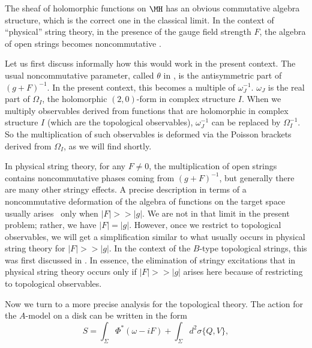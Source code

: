 The sheaf of holomorphic functions on $\MH$ has an obvious
commutative algebra structure, which is the correct one in the
classical limit. In the context of ``physical'' string theory, in
the presence of the gauge field strength $F$, the algebra of open
strings becomes noncommutative \cite{ref137}.

Let us first discuss informally how
this would work in the present context.  The usual noncommutative parameter, called $\theta$ in
\cite{ref137}, is the antisymmetric
part of $(g+F)^{-1}$.  In the present context, this becomes a multiple of $\omega_J^{-1}$.  $\omega_J$
is the real part of $\Omega_I$, the holomorphic $(2,0)$-form in complex structure $I$.  When we multiply
observables derived from functions
that are holomorphic in complex structure $I$ (which are the topological
observables), $\omega_J^{-1}$ can be replaced by $\Omega_I^{-1}$.  So the multiplication of such
observables  is deformed via the Poisson brackets derived from
$\Omega_I$, as we will find shortly.

In physical string theory, for any $F\not=0$, the multiplication of open strings contains noncommutative
phases coming from $(g+F)^{-1}$, but generally there are many other stringy effects.  A precise
description in terms of a noncommutative deformation of the algebra of functions on the target space
usually arises \cite{ref137}\ only when $|F|>>|g|$.
We are not in that limit in the present problem; rather, we have $|F|=|g|$.  However,
once we restrict to topological observables, we will get a simplification
similar to what usually occurs in physical string theory for $|F|>>|g|$.
In the context of the $B$-type topological
strings, this was first discussed in \cite{ref71}.  In essence, the elimination of stringy excitations that
in physical string theory occurs only if $|F|>>|g|$ arises here because of restricting to topological
observables.

Now we turn to a more precise analysis for the topological theory.
The action for the
$A$-model on a disk can be written in the form %
\setcounter{equation}{7}
\begin{equation}\label{eq:mortop}
S=\int_\Sigma \Phi^*(\omega-iF)+\int_\Sigma d^2\sigma \{Q,V\},
\end{equation}

